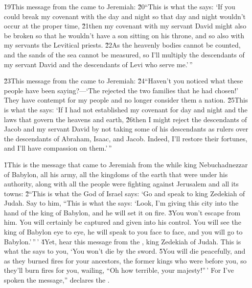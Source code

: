 \v{19}This message from the  came to Jeremiah: \v{20}``This is what the  says: `If you could break my covenant with the day and night so that day and night wouldn't occur at the proper time, \v{21}then my covenant with my servant David might also be broken so that he wouldn't have a son sitting on his throne, and so also with my servants the Levitical priests. \v{22}As the heavenly bodies cannot be counted, and the sands of the sea cannot be measured, so I'll multiply the descendants of my servant David and the descendants of Levi who serve me.'\,''

\v{23}This message from the  came to Jeremiah: \v{24}``Haven't you noticed what these people have been saying?---`The  rejected the two families that he had chosen!' They have contempt for my people and no longer consider them a nation. \v{25}This is what the  says: `If I had not established my covenant for day and night and the laws that govern the heavens and earth, \v{26}then I might reject the descendants of Jacob and my servant David by not taking some of his descendants as rulers over the descendants of Abraham, Isaac, and Jacob. Indeed, I'll restore their fortunes, and I'll have compassion on them.'\,''

\v{1}This is the message that came to Jeremiah from the  while king Nebuchadnezzar of Babylon, all his army, all the kingdoms of the earth that were under his authority, along with all the people were fighting against Jerusalem and all its towns: \v{2}``This is what the  God of Israel says: `Go and speak to king Zedekiah of Judah. Say to him, ``This is what the  says: `Look, I'm giving this city into the hand of the king of Babylon, and he will set it on fire. \v{3}You won't escape from him. You will certainly be captured and given into his control. You will see the king of Babylon eye to eye, he will speak to you face to face, and you will go to Babylon.'\,''\,' \v{4}Yet, hear this message from the , king Zedekiah of Judah. This is what the  says to you, `You won't die by the sword. \v{5}You will die peacefully, and as they burned fires for your ancestors, the former kings who were before you, so they'll burn fires for you, wailing, ``Oh how terrible, your majesty!''\,' For I've spoken the message,'' declares the .


